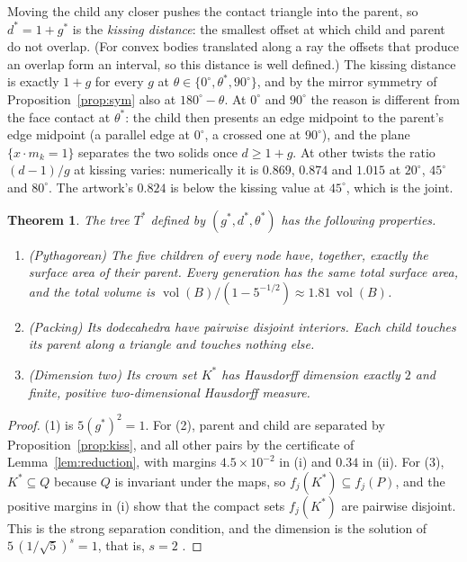 \documentclass[11pt,a4paper]{article}
\newtheorem{theorem}{Theorem}
\theoremstyle{definition}
\theoremstyle{remark}
\newcommand{\vol}{\operatorname{vol}}
\begin{document}
Moving the child any closer pushes the contact triangle into the parent, so
$d^*=1+g^*$ is the \emph{kissing distance}: the smallest offset at which child
and parent do not overlap.  (For convex bodies translated along a ray the
offsets that produce an overlap form an interval, so this distance is well
defined.)  The kissing distance is exactly $1+g$ for every $g$ at
$\theta\in\{0^\circ,\theta^*,90^\circ\}$, and by the mirror symmetry of
Proposition~\ref{prop:sym} also at $180^\circ-\theta$.  At $0^\circ$ and
$90^\circ$ the reason is different from the face contact at $\theta^*$: the
child then presents an edge midpoint to the parent's edge midpoint (a parallel
edge at $0^\circ$, a crossed one at $90^\circ$), and the plane
$\{x\cdot m_k=1\}$ separates the two solids once $d\ge1+g$.  At other twists
the ratio $(d-1)/g$ at kissing varies: numerically it is $0.869$, $0.874$ and
$1.015$ at $20^\circ$, $45^\circ$ and $80^\circ$.  The artwork's $0.824$ is
below the kissing value at $45^\circ$, which is the joint.

\begin{theorem}\label{thm:pythtree}
The tree $T^*$ defined by $(g^*,d^*,\theta^*)$ has the following properties.
\begin{enumerate}
\item \emph{(Pythagorean)} The five children of every node have, together,
exactly the surface area of their parent.  Every generation has the same total
surface area, and the total volume is $\vol(B)/(1-5^{-1/2})\approx1.81\,\vol(B)$.
\item \emph{(Packing)} Its dodecahedra have pairwise disjoint interiors.  Each
child touches its parent along a triangle and touches nothing else.
\item \emph{(Dimension two)} Its crown set $K^*$ has Hausdorff dimension
exactly $2$ and finite, positive two-dimensional Hausdorff measure.
\end{enumerate}
\end{theorem}

\begin{proof}
(1) is $5(g^*)^2=1$.  For (2), parent and child are separated by
Proposition~\ref{prop:kiss}, and all other pairs by the certificate of
Lemma~\ref{lem:reduction}, with margins $4.5\times10^{-2}$ in (i) and $0.34$ in
(ii).  For (3), $K^*\subseteq Q$ because $Q$ is invariant under the maps, so
$f_j(K^*)\subseteq f_j(P)$, and the positive margins in (i) show that the
compact sets $f_j(K^*)$ are pairwise disjoint.  This is the strong separation
condition, and the dimension is the solution of $5\,(1/\sqrt5)^s=1$, that is,
$s=2$ \cite{Hutchinson1981,Falconer2014}.
\end{proof}
\end{document}
